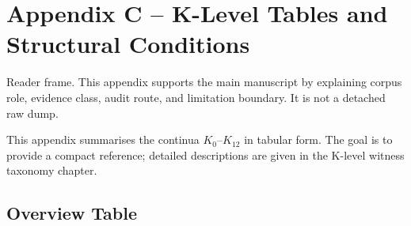 
\section{Appendix C -- K-Level Tables and Structural Conditions}
Reader frame. This appendix supports the main manuscript by explaining corpus role, evidence class, audit route, and limitation boundary. It is not a detached raw dump.

\label{app:klevels-tables}

This appendix summarises the continua \(K_0\)–\(K_{12}\) in tabular form.
The goal is to provide a compact reference; detailed descriptions are given in
the K-level witness taxonomy chapter.

\begingroup
\footnotesize
\RaggedRight
\sloppy
\setlength{\tabcolsep}{4pt}

\subsection{Overview Table}

